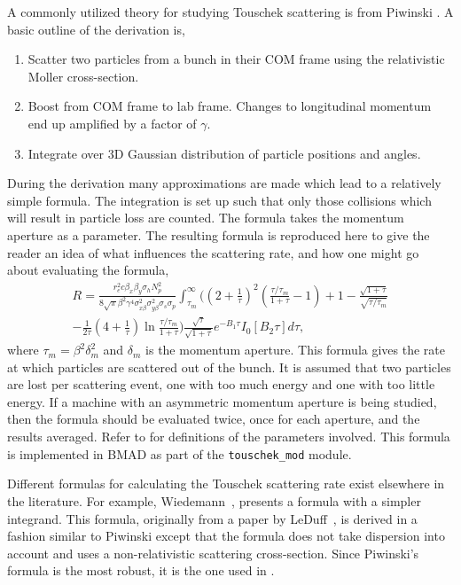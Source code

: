 A commonly utilized theory for studying Touschek scattering is from Piwinski \cite{b:piwinski}.  A
basic outline of the derivation is,
\begin{enumerate}
\item Scatter two particles from a bunch in their COM frame using the relativistic
Moller cross-section.
\item Boost from COM frame to lab frame.  Changes to longitudinal momentum end up 
amplified by a factor of $\gamma$.
\item Integrate over 3D Gaussian distribution of particle positions and angles.
\end{enumerate}
During the derivation many approximations are made which lead to a relatively simple formula.  The
integration is set up such that only those collisions which will result in particle loss are
counted.  The formula takes the momentum aperture as a parameter.  The resulting formula is
reproduced here to give the reader an idea of what influences the scattering rate, and how one might
go about evaluating the formula,
\begin{multline}
R=\frac{r_e^2 c\beta_x\beta_y\sigma_h N_p^2}{8\sqrt\pi\beta^2\gamma^4\sigma_{x\beta}^2
\sigma_{y\beta}^2\sigma_s\sigma_p}\int_{\tau_m}^\infty\Bigg(
\left(2+\frac{1}{\tau}\right)^2\left(\frac{\tau/\tau_m}{1+\tau}-1\right)+1
-\frac{\sqrt{1+\tau}}{\sqrt{\tau/\tau_m}}\\
-\frac{1}{2\tau}\left(4+\frac{1}{\tau}\right)\ln\frac{\tau/\tau_m}{1+\tau}\Bigg)
\frac{\sqrt\tau}{\sqrt{1+\tau}}e^{-B_1\tau}I_0\left[B_2\tau\right]d\tau,
\end{multline}
where $\tau_m=\beta^2\delta_m^2$ and $\delta_m$ is the momentum aperture.  This formula gives the
rate at which particles are scattered out of the bunch.  It is assumed that two particles are lost
per scattering event, one with too much energy and one with too little energy.  If a machine with an
asymmetric momentum aperture is being studied, then the formula should be evaluated twice, once for
each aperture, and the results averaged.  Refer to \cite{b:piwinski} for definitions of the
parameters involved.  This formula is implemented in BMAD as part of the {\tt touschek\_mod} module.

Different formulas for calculating the Touschek scattering rate exist elsewhere in the literature.
For example, Wiedemann~\cite{b:wiedemann}, presents a formula with a simpler integrand.  This
formula, originally from a paper by LeDuff~\cite{b:leduff}, is derived in a fashion similar to
Piwinski except that the formula does not take dispersion into account and uses a non-relativistic
scattering cross-section.  Since Piwinski's formula is the most robust, it is the one used in \bmad.

